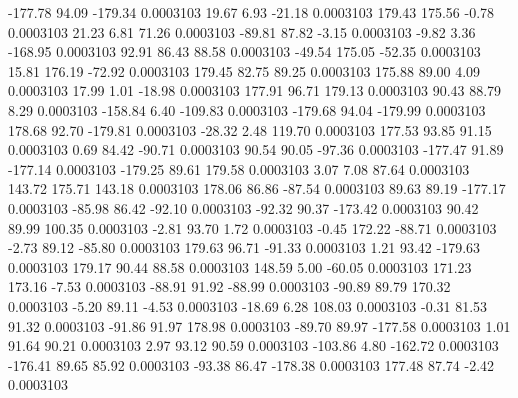      -177.78       94.09     -179.34     0.0003103
       19.67        6.93      -21.18     0.0003103
      179.43      175.56       -0.78     0.0003103
       21.23        6.81       71.26     0.0003103
      -89.81       87.82       -3.15     0.0003103
       -9.82        3.36     -168.95     0.0003103
       92.91       86.43       88.58     0.0003103
      -49.54      175.05      -52.35     0.0003103
       15.81      176.19      -72.92     0.0003103
      179.45       82.75       89.25     0.0003103
      175.88       89.00        4.09     0.0003103
       17.99        1.01      -18.98     0.0003103
      177.91       96.71      179.13     0.0003103
       90.43       88.79        8.29     0.0003103
     -158.84        6.40     -109.83     0.0003103
     -179.68       94.04     -179.99     0.0003103
      178.68       92.70     -179.81     0.0003103
      -28.32        2.48      119.70     0.0003103
      177.53       93.85       91.15     0.0003103
        0.69       84.42      -90.71     0.0003103
       90.54       90.05      -97.36     0.0003103
     -177.47       91.89     -177.14     0.0003103
     -179.25       89.61      179.58     0.0003103
        3.07        7.08       87.64     0.0003103
      143.72      175.71      143.18     0.0003103
      178.06       86.86      -87.54     0.0003103
       89.63       89.19     -177.17     0.0003103
      -85.98       86.42      -92.10     0.0003103
      -92.32       90.37     -173.42     0.0003103
       90.42       89.99      100.35     0.0003103
       -2.81       93.70        1.72     0.0003103
       -0.45      172.22      -88.71     0.0003103
       -2.73       89.12      -85.80     0.0003103
      179.63       96.71      -91.33     0.0003103
        1.21       93.42     -179.63     0.0003103
      179.17       90.44       88.58     0.0003103
      148.59        5.00      -60.05     0.0003103
      171.23      173.16       -7.53     0.0003103
      -88.91       91.92      -88.99     0.0003103
      -90.89       89.79      170.32     0.0003103
       -5.20       89.11       -4.53     0.0003103
      -18.69        6.28      108.03     0.0003103
       -0.31       81.53       91.32     0.0003103
      -91.86       91.97      178.98     0.0003103
      -89.70       89.97     -177.58     0.0003103
        1.01       91.64       90.21     0.0003103
        2.97       93.12       90.59     0.0003103
     -103.86        4.80     -162.72     0.0003103
     -176.41       89.65       85.92     0.0003103
      -93.38       86.47     -178.38     0.0003103
      177.48       87.74       -2.42     0.0003103
